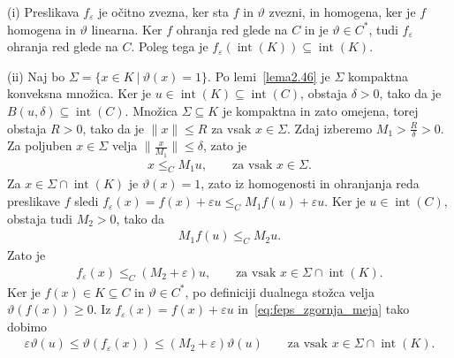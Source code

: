\documentclass[mat2, tisk]{fmfdelo}
\begin{document}
\begin{dokaz}
  (i) Preslikava $f_\varepsilon$ je očitno zvezna, ker sta $f$ in $\vartheta$ zvezni, in homogena, 
  ker je $f$ homogena in $\vartheta$ linearna. Ker
  $f$ ohranja red glede na $C$ in je $\vartheta\in C^*$, tudi
  $f_\varepsilon$ ohranja red glede na $C$. Poleg tega je
  $f_\varepsilon(\operatorname{int}(K))
  \subseteq\operatorname{int}(K)$.

  (ii) Naj bo $\Sigma=\{x\in K ~|~ \vartheta(x)=1\}$. Po
  lemi~\ref{lema2.46} je $\Sigma$ kompaktna konveksna množica.
  Ker je $u\in\operatorname{int}(K)\subseteq\operatorname{int}(C)$, obstaja $\delta>0$, tako da je 
  $B(u,\delta)\subseteq\operatorname{int}(C)$. 
  Množica $\Sigma\subseteq K$ je kompaktna in zato omejena, torej obstaja $R>0$, tako da je $\|x\| \leq R$ 
  za vsak $x\in\Sigma$. Zdaj izberemo $M_1 > \frac{R}{\delta} > 0$. Za poljuben $x\in\Sigma$ velja 
  $\|\frac{x}{M_1}\| \leq \delta$, zato je 
  \begin{align}
  x\leq_C M_1u,
  \qquad
  \text{za vsak }x\in\Sigma.
  \label{eq:dominacija_sigma_u}
  \end{align}
  Za $x\in\Sigma\cap\operatorname{int}(K)$ je
  $\vartheta(x)=1$, zato iz homogenosti in ohranjanja reda preslikave $f$
  sledi
  $f_\varepsilon(x)=f(x)+\varepsilon u
  \leq_C M_1f(u)+\varepsilon u$.
  Ker je $u\in\operatorname{int}(C)$, obstaja tudi $M_2>0$, tako da
  \begin{align}
  M_1f(u)\leq_C M_2u.
  \label{eq:M1fu_M2u}
  \end{align}
  Zato je
  \begin{align}
  f_\varepsilon(x)
  \leq_C
  (M_2+\varepsilon)u,
  \qquad
  \text{za vsak }
  x\in\Sigma\cap\operatorname{int}(K).
  \label{eq:feps_zgornja_meja}
  \end{align}
  Ker je $f(x)\in K\subseteq C$ in $\vartheta\in C^*$, po definiciji dualnega stožca velja
  $\vartheta(f(x))\geq0$. Iz
  $f_\varepsilon(x)=f(x)+\varepsilon u$ in~\eqref{eq:feps_zgornja_meja} tako dobimo
  \begin{align}
  \varepsilon\vartheta(u)
  \leq
  \vartheta(f_\varepsilon(x))
  \leq
  (M_2+\varepsilon)\vartheta(u)
  \qquad
  \text{za vsak }
  x\in\Sigma\cap\operatorname{int}(K).
  \label{eq:vartheta_feps}
  \end{align}


\end{dokaz}
\end{document}
